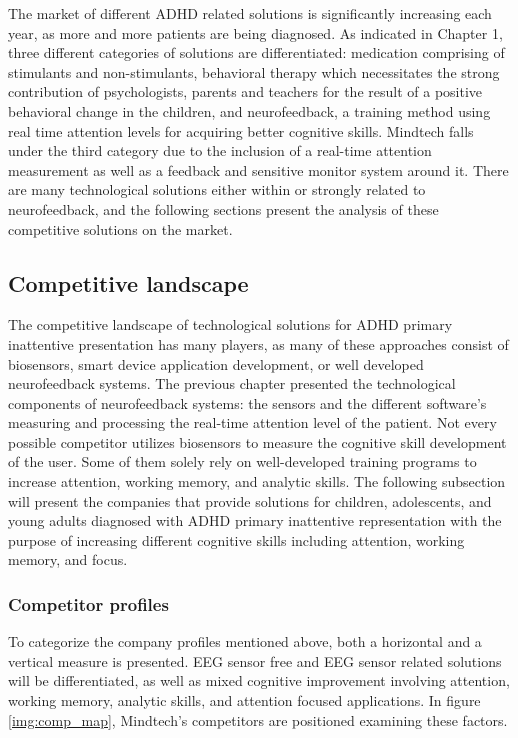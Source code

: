 \documentclass[letterpaper,10pt]{article}
\let\oldsubsection\subsection
\renewcommand{\subsection}{\def\cursectioning{subsection}\oldsubsection}
\begin{document}
The market of different ADHD related solutions is significantly increasing each year, as more and more patients are being diagnosed. As indicated in Chapter 1, three different categories of solutions are differentiated: medication comprising of stimulants and non-stimulants, behavioral therapy which necessitates the strong contribution of psychologists, parents and teachers for the result of a positive behavioral change in the children, and neurofeedback, a training method using real time attention levels for acquiring better cognitive skills.
Mindtech falls under the third category due to the inclusion of a real-time attention measurement as well as a feedback and sensitive monitor system around it. There are many technological solutions either within or strongly related to neurofeedback, and the following sections present the analysis of these competitive solutions on the market.





\subsection{Competitive landscape}

The competitive landscape of technological solutions for ADHD primary inattentive presentation has many players, as many of these approaches consist of biosensors, smart device application development, or well developed neurofeedback systems. The previous chapter presented the technological components of neurofeedback systems: the sensors and the different software's measuring and processing the real-time attention level of the patient.
Not every possible competitor utilizes biosensors to measure the cognitive skill development of the user. Some of them solely rely on well-developed training programs to increase attention, working memory, and analytic skills.
The following subsection will present the companies that provide solutions for children, adolescents, and young adults diagnosed with ADHD primary inattentive representation with the purpose of increasing different cognitive skills including attention, working memory, and focus.

\subsubsection{Competitor profiles}

To categorize the company profiles mentioned above, both a horizontal and a vertical measure is presented. EEG sensor free and EEG sensor related solutions will be differentiated, as well as mixed cognitive improvement involving attention, working memory, analytic skills, and attention focused applications. In figure \ref{img:comp_map}, Mindtech's competitors are positioned examining these factors. 
\end{document}

